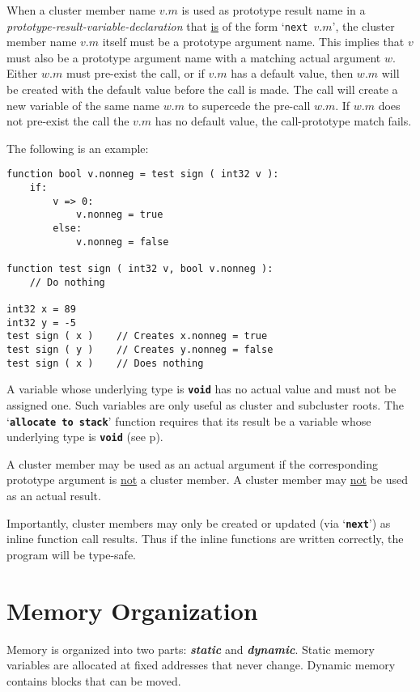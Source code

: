 \documentclass[12pt]{article}
\newcommand{\TT}[1]{{\tt \bfseries #1}}
\newcommand{\key}[1]{{\bf \em #1}\index{#1}}
\newcommand{\pagref}[1]{p\pageref{#1}}
\newenvironment{indpar}[1][0.3in]%
	{\begin{list}{}%
		     {\setlength{\itemsep}{0in}%
		      \setlength{\topsep}{0in}%
		      \setlength{\parsep}{1ex}%
		      \setlength{\labelwidth}{#1}%
		      \setlength{\leftmargin}{#1}%
		      \addtolength{\leftmargin}{\labelsep}}%
	 \item}%
	{\end{list}}
\begin{document}
When a cluster member name $v.m$ is used as prototype result name in
a {\em prototype-result-variable-declaration} that \underline{is}
of the form `{\tt next $v.m$}', the cluster member name $v.m$ itself
must be a prototype argument name.  This implies that $v$ must also
be a prototype argument name with a matching actual argument $w$.
Either $w.m$ must pre-exist the call, or if $v.m$ has a default
value, then $w.m$ will be created with the default value before
the call is made.  The call will create a new variable of the
same name $w.m$ to supercede the pre-call $w.m$.
If $w.m$ does not pre-exist the call the $v.m$ has no default
value, the call-prototype match fails.

The following is an example:
\begin{indpar}\begin{verbatim}
function bool v.nonneg = test sign ( int32 v ):
    if:
        v => 0:
            v.nonneg = true
        else:
            v.nonneg = false

function test sign ( int32 v, bool v.nonneg ):
    // Do nothing

int32 x = 89
int32 y = -5
test sign ( x )    // Creates x.nonneg = true
test sign ( y )    // Creates y.nonneg = false
test sign ( x )    // Does nothing
\end{verbatim}\end{indpar}

A variable whose underlying type is \TT{void} has no actual value
and must not be assigned one.  Such variables are only useful
as cluster and subcluster roots.  The `\TT{allocate to stack}'
function requires that its result be a variable whose underlying
type is \TT{void} (see \pagref{ALLOCATE-TO-STACK}).

A cluster member may be used as an actual argument if
the corresponding prototype argument is
\underline{not} a cluster member.  A cluster member may \underline{not}
be used as an actual result.

Importantly, cluster members may only be created or updated
(via `\TT{next}')
as inline function call results.  Thus if
the inline functions are written correctly, the program will be type-safe.

\section{Memory Organization}
\label{MEMORY-ORGANIZATION}

Memory is organized into two parts: \key{static} and \key{dynamic}.
Static memory variables are allocated at fixed addresses
that never change.  Dynamic memory contains blocks that
can be moved.
\end{document}
